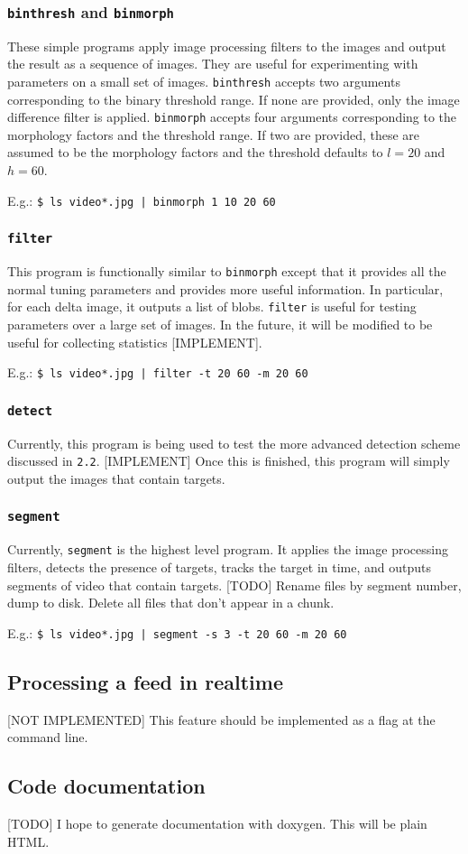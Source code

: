 \documentclass[letter]{article}
\begin{document}
\subsubsection{\texttt{binthresh} and \texttt{binmorph}}
These simple programs apply image processing filters to the images and output the
result as a sequence of images. They are useful for experimenting with parameters 
on a small set of images. \texttt{binthresh} accepts two arguments corresponding
to the binary threshold range. If none are provided, only the image difference filter 
is applied. \texttt{binmorph} accepts four arguments  corresponding to the morphology 
factors and the threshold range. If two are provided, these are assumed to be the
morphology factors and the threshold defaults to $l=20$ and $h=60$. 

E.g.: \texttt{\$ ls video*.jpg | binmorph 1 10 20 60}

\subsubsection{\texttt{filter}}
This program is functionally similar to \texttt{binmorph} except that it provides all 
the normal tuning parameters and provides more useful information. In particular, for 
each delta image, it outputs a list of blobs. \texttt{filter} is useful for testing 
parameters over a large set of images. In the future, it will be modified to be useful
for collecting statistics [IMPLEMENT].  

E.g.: \texttt{\$ ls video*.jpg | filter -t 20 60 -m 20 60}

\subsubsection{\texttt{detect}}
Currently, this program is being used to test the more advanced detection scheme 
discussed in \texttt{2.2}. [IMPLEMENT] Once this is finished, this program will 
simply output the images that contain targets. 

\subsubsection{\texttt{segment}}
Currently, \texttt{segment} is the highest level program. It applies the image 
processing filters, detects the presence of targets, tracks the target in time, 
and outputs segments of video that contain targets. [TODO] Rename files by 
segment number, dump to disk. Delete all files that don't appear in a chunk. 

E.g.: \texttt{\$ ls video*.jpg | segment -s 3 -t 20 60 -m 20 60}


\subsection{Processing a feed in realtime}
[NOT IMPLEMENTED] This feature should be implemented as a flag at the command line. 

\subsection{Code documentation}
[TODO] I hope to generate documentation with doxygen. This will be plain HTML. 
\end{document}
